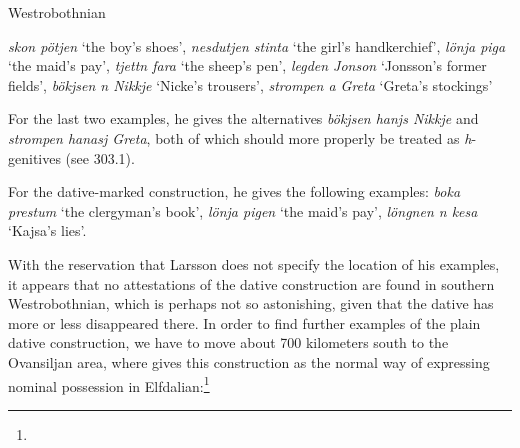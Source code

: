 
\begin{listWWNumileveli}
\item {}

\begin{styleExample}
Westrobothnian

\end{styleExample}

\end{listWWNumileveli}

\begin{styleBlockQuote}
\textit{skon pötjen} ‘the boy’s shoes’, \textit{nesdutjen stinta} ‘the girl’s handkerchief’, \textit{lönja piga} ‘the maid’s pay’, \textit{tjettn fara} ‘the sheep’s pen’, \textit{legden Jonson} ‘Jonsson’s former fields’, \textit{bökjsen n Nikkje} ‘Nicke’s trousers’, \textit{strompen a Greta} ‘Greta’s stockings’

\end{styleBlockQuote}

\begin{styleBodyTextFirst}
For the last two examples, he gives the alternatives \textit{bökjsen hanjs Nikkje} and \textit{strompen hanasj Greta}, both of which should more properly be treated as \textit{h}{}-genitives (see 303.1).

\end{styleBodyTextFirst}

\begin{styleBodytextC}
For the dative-marked construction, he gives the following examples: \textit{boka prestum} ‘the clergyman’s book’, \textit{lönja pigen} ‘the maid’s pay’,\textit{ löngnen n kesa} ‘Kajsa’s lies’. 

\end{styleBodytextC}

\begin{styleBodytextC}
With the reservation that Larsson does not specify the location of his examples, it appears that no attestations of the dative construction are found in southern Westrobothnian, which is perhaps not so astonishing, given that the dative has more or less disappeared there. In order to find further examples of the plain dative construction, we have to move about 700 kilometers south to the Ovansiljan area, where \citet[97]{Levander1909} gives this construction as the normal way of expressing nominal possession in Elfdalian:\footnote{}

\end{styleBodytextC}

